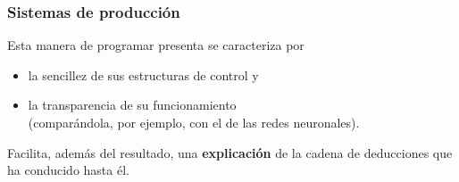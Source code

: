 \documentclass{beamer}    %
\newcommand\cod{../scripts}
\begin{document}

\begin{frame}
 \frametitle{Sistemas de producción}

 Esta manera de programar presenta se caracteriza por

 \begin{itemize}
 \item
 la sencillez de sus estructuras de control y

 \item
 la transparencia de su funcionamiento\\[2mm]

 (comparándola, por ejemplo, con el de las redes neuronales).
 \end{itemize}
 \vspace{5mm}

 Facilita, además del resultado, una {\bf explicación} de la
 cadena de deducciones que ha conducido hasta él.
\end{frame}
\end{document}
